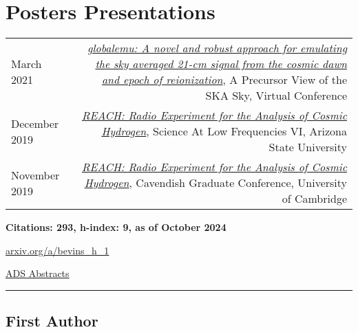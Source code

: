 \documentclass{article}
\begin{document}
\section*{Posters Presentations}

\begin{tabular}{L!{\vrule}R}
	March 2021 & \href{https://github.com/htjb/Talks/blob/master/Posters/SKA_globalemu_March_2021/globalemu.pdf}{\textit{globalemu: A novel and robust approach for emulating the sky averaged 21-cm signal from the cosmic dawn and epoch of reionization}}, A Precursor View of the SKA Sky, Virtual Conference\\
	December 2019 & \href{https://drive.google.com/file/d/1dvgumyu4cXxXqoYxikU3DKOa4u_gpGzn/view}{\textit{REACH: Radio Experiment for the Analysis of Cosmic Hydrogen}}, Science At Low Frequencies VI, Arizona State University \\
	November 2019 & \href{https://github.com/htjb/Talks/blob/master/Posters/Cav_Graduate_Conf_REACH_Nov_2019/REACH_poster.pdf}{\textit{REACH: Radio Experiment for the Analysis of Cosmic Hydrogen}}, Cavendish Graduate Conference, University of Cambridge
\end{tabular}

\hfill \break

 \hfill \textbf{Citations: 293, h-index: 9, as of October 2024}

\hfill \href{http://arxiv.org/a/bevins_h_1}{arxiv.org/a/bevins\_h\_1}

\hfill \href{https://ui.adsabs.harvard.edu/search/p_=0&q=author\%3A\%22Bevins\%2C\%20H.\%20T.\%20J.\%22&sort=date\%20desc\%2C\%20bibcode\%20desc}{ADS Abstracts}
\par\noindent\rule{\textwidth}{0.5pt}


\subsection*{First Author}
\end{document}
